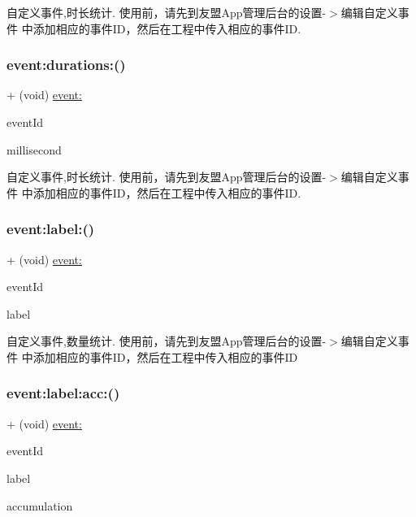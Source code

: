 自定义事件,时长统计. 使用前，请先到友盟\+App管理后台的设置-\/$>$编辑自定义事件 中添加相应的事件\+I\+D，然后在工程中传入相应的事件\+ID. \mbox{\label{interfaceMobClick_ab4e28c81cca47af267c814b0e4a3b002}} 
\subsubsection{\texorpdfstring{event\+:durations\+:()}{event:durations:()}}
{\footnotesize\ttfamily + (void) \hyperlink{interfaceMobClick_a1e1c48199935a97e0d96562627821641}{event\+:} \begin{DoxyParamCaption}\item[{(N\+S\+String $\ast$)}]{event\+Id }\item[{durations:(int)}]{millisecond }\end{DoxyParamCaption}}

自定义事件,时长统计. 使用前，请先到友盟\+App管理后台的设置-\/$>$编辑自定义事件 中添加相应的事件\+I\+D，然后在工程中传入相应的事件\+ID. \mbox{\label{interfaceMobClick_a034f01f9ce387e1c984c8f22eaf50101}} 
\subsubsection{\texorpdfstring{event\+:label\+:()}{event:label:()}}
{\footnotesize\ttfamily + (void) \hyperlink{interfaceMobClick_a1e1c48199935a97e0d96562627821641}{event\+:} \begin{DoxyParamCaption}\item[{(N\+S\+String $\ast$)}]{event\+Id }\item[{label:(N\+S\+String $\ast$)}]{label }\end{DoxyParamCaption}}

自定义事件,数量统计. 使用前，请先到友盟\+App管理后台的设置-\/$>$编辑自定义事件 中添加相应的事件\+I\+D，然后在工程中传入相应的事件\+ID \mbox{\label{interfaceMobClick_ab1cf1e7dbe11d6c5b0d2cc85eef3f1a9}} 
\subsubsection{\texorpdfstring{event\+:label\+:acc\+:()}{event:label:acc:()}}
{\footnotesize\ttfamily + (void) \hyperlink{interfaceMobClick_a1e1c48199935a97e0d96562627821641}{event\+:} \begin{DoxyParamCaption}\item[{(N\+S\+String $\ast$)}]{event\+Id }\item[{label:(N\+S\+String $\ast$)}]{label }\item[{acc:(N\+S\+Integer)}]{accumulation }\end{DoxyParamCaption}}

